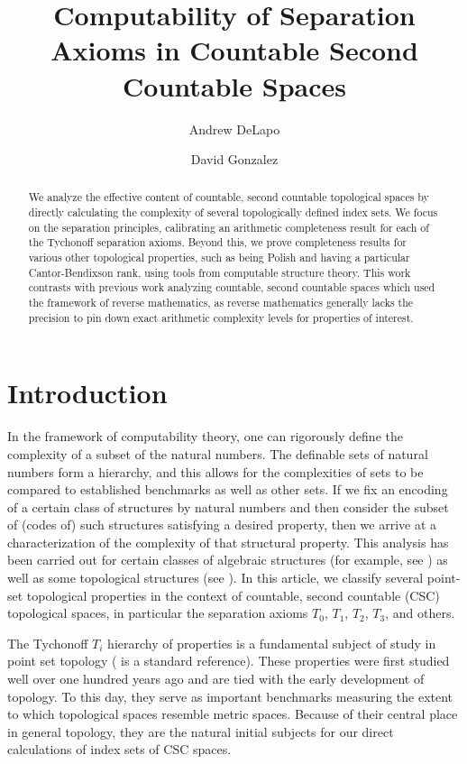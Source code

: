 \documentclass[11pt]{amsart}
\title{Computability of Separation Axioms in Countable Second Countable Spaces}
\author{Andrew DeLapo}
\author{David Gonzalez}
\theoremstyle{remark}
\begin{document}
\maketitle

\begin{abstract}
    We analyze the effective content of countable, second countable topological spaces by directly calculating the complexity of several topologically defined index sets.
    We focus on the separation principles, calibrating an arithmetic completeness result for each of the Tychonoff separation axioms.
    Beyond this, we prove completeness results for various other topological properties, such as being Polish and having a particular Cantor-Bendixson rank, using tools from computable structure theory. 
    This work contrasts with previous work analyzing countable, second countable spaces which used the framework of reverse mathematics, as reverse mathematics generally lacks the precision to pin down exact arithmetic complexity levels for properties of interest.
\end{abstract}

\section{Introduction}

In the framework of computability theory, one can rigorously define the complexity of a subset of the natural numbers. The definable sets of natural numbers form a hierarchy, and this allows for the complexities of sets to be compared to established benchmarks as well as other sets. If we fix an encoding of a certain class of structures by natural numbers and then consider the subset of (codes of) such structures satisfying a desired property, then we arrive at a characterization of the complexity of that structural property. This analysis has been carried out for certain classes of algebraic structures (for example, see \cite{C04, C05, KS17}) as well as some topological structures (see \cite{HTM23, T23}). In this article, we classify several point-set topological properties in the context of countable, second countable (CSC) topological spaces, in particular the separation axioms $T_0$, $T_1$, $T_2$, $T_3$, and others.

The Tychonoff $T_i$ hierarchy of properties is a fundamental subject of study in point set topology (\cite[Chapter 4]{K75} is a standard reference).
These properties were first studied well over one hundred years ago and are tied with the early development of topology.
To this day, they serve as important benchmarks measuring the extent to which topological spaces resemble metric spaces.
Because of their central place in general topology, they are the natural initial subjects for our direct calculations of index sets of CSC spaces.
\end{document}
